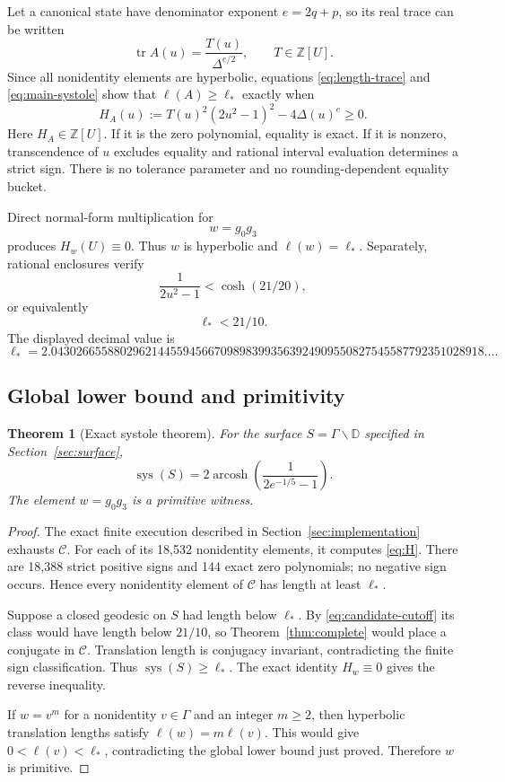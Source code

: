 \documentclass[11pt,a4paper]{article}
\newtheorem{theorem}{Theorem}[section]
\theoremstyle{definition}
\newcommand{\D}{\mathbb D}
\newcommand{\Z}{\mathbb Z}
\newcommand{\tr}{\operatorname{tr}}
\newcommand{\arcosh}{\operatorname{arcosh}}
\newcommand{\sys}{\operatorname{sys}}
\newcommand{\length}{\ell}
\begin{document}
Let a canonical state have denominator exponent \(e=2q+p\), so its real
trace can be written
\[
 \tr A(u)=\frac{T(u)}{\Delta^{e/2}},\qquad T\in\Z[U].
\]
Since all nonidentity elements are hyperbolic, equations
\eqref{eq:length-trace} and \eqref{eq:main-systole} show that
\(\length(A)\geq\length_*\) exactly when
\begin{equation}\label{eq:H}
 H_A(u):=T(u)^2(2u^2-1)^2-4\Delta(u)^e\geq0.
\end{equation}
Here \(H_A\in\Z[U]\).  If it is the zero polynomial, equality is exact.  If it
is nonzero, transcendence of \(u\) excludes equality and rational interval
evaluation determines a strict sign.  There is no tolerance parameter and no
rounding-dependent equality bucket.

Direct normal-form multiplication for
\begin{equation}\label{eq:witness}
 w=g_0g_3
\end{equation}
produces \(H_w(U)\equiv0\).  Thus \(w\) is hyperbolic and
\(\length(w)=\length_*\).  Separately, rational enclosures verify
\[
 \frac{1}{2u^2-1}<\cosh(21/20),
\]
or equivalently
\begin{equation}\label{eq:candidate-cutoff}
 \length_*<21/10.
\end{equation}
The displayed decimal value is
\[
 \length_*=2.043026655880296214455945667098983993563924909550827545587792351028918\ldots.
\]

\subsection{Global lower bound and primitivity}

\begin{theorem}[Exact systole theorem]\label{thm:systole}
For the surface \(S=\Gamma\backslash\D\) specified in
Section~\ref{sec:surface},
\[
 \sys(S)=2\arcosh\!\left(\frac{1}{2e^{-1/5}-1}\right).
\]
The element \(w=g_0g_3\) is a primitive witness.
\end{theorem}

\begin{proof}
The exact finite execution described in Section~\ref{sec:implementation}
exhausts \(\mathcal C\).  For each of its 18,532 nonidentity elements, it
computes \eqref{eq:H}.  There are 18,388 strict positive signs and 144 exact
zero polynomials; no negative sign occurs.  Hence every nonidentity element
of \(\mathcal C\) has length at least \(\length_*\).

Suppose a closed geodesic on \(S\) had length below \(\length_*\).  By
\eqref{eq:candidate-cutoff} its class would have length below \(21/10\), so
Theorem~\ref{thm:complete} would place a conjugate in \(\mathcal C\).
Translation length is conjugacy invariant, contradicting the finite sign
classification.  Thus \(\sys(S)\geq\length_*\).  The exact identity
\(H_w\equiv0\) gives the reverse inequality.

If \(w=v^m\) for a nonidentity \(v\in\Gamma\) and an integer \(m\geq2\), then
hyperbolic translation lengths satisfy
\(\length(w)=m\length(v)\).  This would give
\(0<\length(v)<\length_*\), contradicting the global lower bound just proved.
Therefore \(w\) is primitive.
\end{proof}
\end{document}

